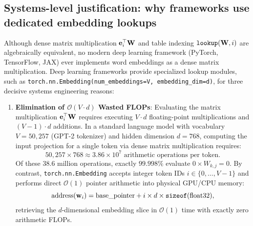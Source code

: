 \documentclass[../../../main.tex]{subfiles}
\begin{document}
\subsection{Systems-level justification: why frameworks use dedicated embedding lookups}
\label{subsec:systems_embedding_justification}

Although dense matrix multiplication $\mathbf{e}_i^\top \mathbf{W}$ and table indexing $\text{\texttt{lookup}}(\mathbf{W}, i)$ are algebraically equivalent, no modern deep learning framework (PyTorch, TensorFlow, JAX) ever implements word embeddings as a dense matrix multiplication. Deep learning frameworks provide specialized lookup modules, such as \texttt{torch.nn.Embedding(num\_embeddings=V, embedding\_dim=d)}, for three decisive systems engineering reasons:

\begin{enumerate}
    \item \textbf{Elimination of $\mathcal{O}(V \cdot d)$ Wasted FLOPs}:
    Evaluating the matrix multiplication $\mathbf{e}_i^\top \mathbf{W}$ requires executing $V \cdot d$ floating-point multiplications and $(V-1) \cdot d$ additions. In a standard language model with vocabulary $V = 50{,}257$ (GPT-2 tokenizer) and hidden dimension $d = 768$, computing the input projection for a single token via dense matrix multiplication requires:
    \begin{equation}
    \label{eq:flops_wasted}
    50{,}257 \times 768 \approx 3.86 \times 10^7 \text{ arithmetic operations per token}.
    \end{equation}
    Of these $38.6$ million operations, exactly $99.998\%$ evaluate $0 \times W_{k, j} = 0$. By contrast, \texttt{torch.nn.Embedding} accepts integer token IDs $i \in \{0, \dots, V-1\}$ and performs direct $\mathcal{O}(1)$ pointer arithmetic into physical GPU/CPU memory:
    \begin{equation}
    \label{eq:pointer_arithmetic}
    \text{address}(\mathbf{w}_i) = \text{base\_pointer} + i \times d \times \text{\texttt{sizeof}}(\text{float32}),
    \end{equation}
    retrieving the $d$-dimensional embedding slice in $\mathcal{O}(1)$ time with exactly zero arithmetic FLOPs.


\end{enumerate}
\end{document}
